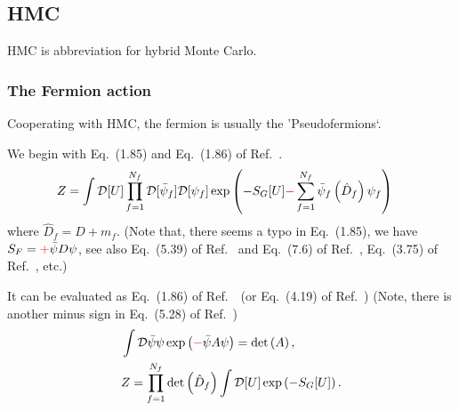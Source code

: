 \subsection{\label{sec:hmc}HMC}

HMC is abbreviation for hybrid Monte Carlo.

\subsubsection{\label{sec:hmc_action}The Fermion action}

Cooperating with HMC, the fermion is usually the 'Pseudofermions`.

We begin with Eq.~(1.85) and Eq.~(1.86) of Ref.~\cite{latticeqcdbook2017}.
\begin{equation}
\begin{split}
&Z=\int \mathcal{D}[U] \prod _{f=1}^{N_f} \mathcal {D}[\bar{\psi}_f]\mathcal {D}[\psi _f]\exp \left(-S_G[U]\textcolor[rgb]{1,0,0}{-}\sum _{f=1}^{N_f}\bar{\psi} _f\left(\hat{D}_f\right)\psi _f\right)
\end{split}
\end{equation}
where $\hat{D}_f=D+m_f$. (Note that, there seems a typo in Eq.~(1.85), we have $S_F=\textcolor[rgb]{1,0,0}{+}\bar{\psi}D\psi$, see also Eq.~(5.39) of Ref.~\cite{latticeqcdbook2010} and Eq.~(7.6) of Ref.~\cite{latticeqcdbook1998}, Eq.~(3.75) of Ref.~\cite{latticeqcdbook2017}, etc.)

It can be evaluated as Eq.~(1.86) of Ref.~\cite{latticeqcdbook2017}~(or Eq.~(4.19) of Ref.~\cite{condensedmatterbookAltland}) (Note, there is another minus sign in Eq.~(5.28) of Ref.~\cite{latticeqcdbook2010})
\begin{equation}
\begin{split}
&\int \mathcal{D}{\bar{\psi}}\psi \exp \left(\textcolor[rgb]{1,0,0}{-}\bar{\psi}A\psi\right)=\det \left(A\right),\\
&Z=\prod _{f=1}^{N_f} \det \left(\hat{D}_f\right)\int \mathcal{D}[U] \exp \left(-S_G[U]\right).\\
\end{split}
\end{equation}

